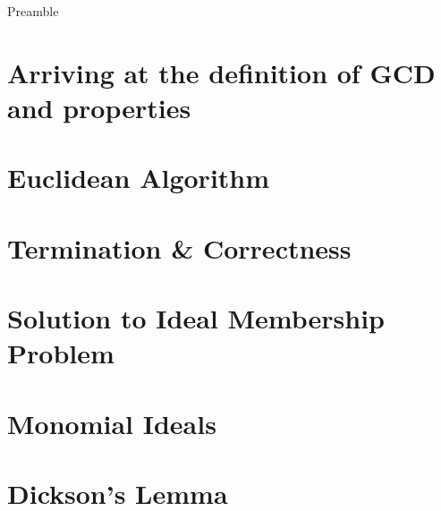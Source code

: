 \noindent
Preamble


\section{Arriving at the definition of GCD and properties}

\section{Euclidean Algorithm}

\section{Termination \& Correctness}

\section{Solution to Ideal Membership Problem}

\section{Monomial Ideals}

\section{Dickson's Lemma}